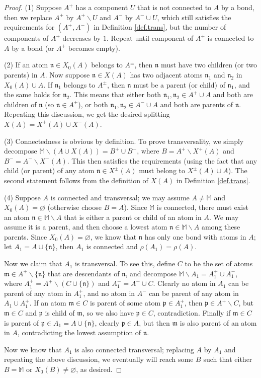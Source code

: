 \documentclass[10pt, reqno]{amsart}
\newcommand{\Mb}{\mathbb M}
\newcommand{\mf}{\mathfrak m}
\newcommand{\pf}{\mathfrak p}
\newcommand{\nf}{\mathfrak n}
\theoremstyle{definition}
\theoremstyle{remark}
\numberwithin{equation}{section}
\begin{document}
\begin{proof} (1) Suppose $A^+$ has a component $U$ that is not connected to $A$ by a bond, then we replace $A^+$ by $A^+\backslash U$ and $A^-$ by $A^-\cup U$, which still satisfies the requirements for $(A^+,A^-)$ in Definition \ref{def.trans}, but the number of components of $A^+$ decreases by $1$. Repeat until component of $A^+$ is connected to $A$ by a bond (or $A^+$ becomes empty).

(2) If an atom $\nf\in X_0(A)$ belongs to $A^\pm$, then $\nf$ must have two children (or two parents) in $A$. Now suppose $\nf\in X(A)$ has two adjacent atoms $\nf_1$ and $\nf_2$ in $X_0(A)\cup A$. If $\nf_1$ belongs to $A^\pm$, then $\nf$ must be a parent (or child) of $\nf_1$, and the same holds for $\nf_2$. This means that either both $\nf_1,\nf_2\in A^+\cup A$ and both are children of $\nf$ (so $\nf\in A^+$), or both $\nf_1,\nf_2\in A^-\cup A$ and both are parents of $\nf$. Repeating this discussion, we get the desired splitting $X(A)=X^+(A)\cup X^-(A)$.

(3) Connectedness is obvious by definition. To prove transversality, we simply decompose $\Mb\backslash (A\cup X(A))=B^+\cup B^-$, where $B=A^+\backslash X^+(A)$ and $B^-=A^-\backslash X^-(A)$. This then satisfies the requirements (using the fact that any child (or parent) of any atom $\nf\in X^\pm(A)$ must belong to $X^\pm(A)\cup A$). The second statement follows from the definition of $X(A)$ in Definition \ref{def.trans}.

(4) Suppose $A$ is connected and transversal; we may assume $A\neq\Mb$ and $X_0(A)=\varnothing$ (otherwise choose $B=A$). Since $\Mb$ is connected, there must exist an atom $\nf\in \Mb\backslash A$ that is either a parent or child of an atom in $A$. We may assume it is a parent, and then choose a lowest atom $\nf\in \Mb\backslash A$ among these parents. Since $X_0(A)=\varnothing$, we know that $\nf$ has only one bond with atoms in $A$; let $A_1=A\cup\{\nf\}$, then $A_1$ is connected and $\rho(A_1)=\rho(A)$.

Now we claim that $A_1$ is transversal. To see this, define $C$ to be the set of atoms $\mf\in A^+\backslash\{\nf\}$ that are descendants of $\nf$, and decompose $\Mb\backslash A_1=A_1^+\cup A_1^-$, where $A_1^+=A^+\backslash (C\cup\{\nf\})$ and $A_1^-=A^-\cup C$. Clearly no atom in $A_1$ can be parent of any atom in $A_1^+$, and no atom in $A^-$ can be parent of any atom in $A_1\cup A_1^+$. If an atom $\mf\in C$ is parent of some atom $\pf\in A_1^+$, then $\pf\in A^+\backslash C$, but $\mf\in C$ and $\pf$ is child of $\mf$, so we also have $\pf\in C$, contradiction. Finally if $\mf\in C$ is parent of $\pf\in A_1=A\cup \{\nf\}$, clearly $\pf\in A$, but then $\mf$ is also parent of an atom in $A$, contradicting the lowest assumption of $\nf$.

Now we know that $A_1$ is also connected transversal; replacing $A$ by $A_1$ and repeating the above discussion, we eventually will reach some $B$ such that either $B=\Mb$ or $X_0(B)\neq\varnothing$, as desired.
\end{proof}
\end{document}
